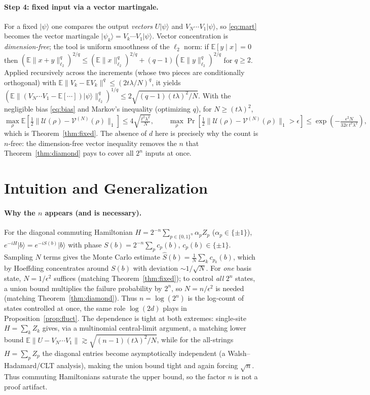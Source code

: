﻿\documentclass[12pt]{article}
\theoremstyle{plain}
\theoremstyle{definition}
\newcommand{\norm}[1]{\lVert #1 \rVert}
\newcommand{\tnorm}[1]{\lVert #1 \rVert_{1}}
\newcommand{\ltwo}[1]{\lVert #1 \rVert_{\ell_2}}
\newcommand{\E}{\mathbb{E}}
\newcommand{\ket}[1]{\lvert #1 \rangle}
\newcommand{\Uchan}{\mathcal{U}}
\newcommand{\Vchan}{\mathcal{V}}
\newcommand{\half}{\tfrac{1}{2}}
\begin{document}
	\paragraph{Step 4: fixed input via a vector martingale.}
	For a fixed $\ket\psi$ one compares the output \emph{vectors} $U\ket\psi$ and
	$V_N\cdots V_1\ket\psi$, so \eqref{eq:mart} becomes the vector martingale
	$\ket{\psi_k}=V_k\cdots V_1\ket\psi$. Vector concentration is \emph{dimension-free}; the tool
	is uniform smoothness of the $\ell_2$ norm: if $\E[y\mid x]=0$ then
	$(\E\ltwo{x+y}^q)^{2/q}\le(\E\ltwo{x}^q)^{2/q}+(q-1)(\E\ltwo{y}^q)^{2/q}$ for $q\ge2$. Applied
	recursively across the increments (whose two pieces are conditionally orthogonal) with
	$\E\norm{V_k-\E V_k}^q\le(2t\lambda/N)^q$, it yields
	$(\E\ltwo{(V_N\cdots V_1-\E[\cdots])\ket\psi}^q)^{1/q}\le2\sqrt{(q-1)(t\lambda)^2/N}$. With the
	negligible bias \eqref{eq:bias} and Markov's inequality (optimizing $q$), for $N\ge(t\lambda)^2$,
	\begin{equation}
		\max_\rho\E[\half\tnorm{\Uchan(\rho)-\Vchan^{(N)}(\rho)}]\le4\sqrt{\tfrac{t^2\lambda^2}{N}},\qquad
		\max_\rho\operatorname{Pr}[\half\tnorm{\Uchan(\rho)-\Vchan^{(N)}(\rho)}>\epsilon]\le\exp(-\tfrac{\epsilon^2N}{32e\,t^2\lambda^2}),
		\label{eq:fixed}
	\end{equation}
	which is Theorem~\ref{thm:fixed}. The absence of $d$ here is precisely why the count is
	$n$-free: the dimension-free vector inequality removes the $n$ that
	Theorem~\ref{thm:diamond} pays to cover all $2^n$ inputs at once.
	
	
	\section{Intuition and Generalization}
	
	\paragraph{Why the $n$ appears (and is necessary).}
	For the diagonal commuting Hamiltonian $H=2^{-n}\sum_{p\in\{0,1\}^n}\alpha_p Z_p$
	($\alpha_p\in\{\pm1\}$), $e^{-iH}\ket b=e^{-iS(b)}\ket b$ with phase
	$S(b)=2^{-n}\sum_p c_p(b)$, $c_p(b)\in\{\pm1\}$. Sampling $N$ terms gives the Monte Carlo
	estimate $\widehat S(b)=\tfrac1N\sum_k c_{p_k}(b)$, which by Hoeffding concentrates around
	$S(b)$ with deviation $\sim1/\sqrt N$. For \emph{one} basis state, $N=1/\epsilon^2$ suffices
	(matching Theorem~\ref{thm:fixed}); to control \emph{all} $2^n$ states, a union bound
	multiplies the failure probability by $2^n$, so $N=n/\epsilon^2$ is needed (matching
	Theorem~\ref{thm:diamond}). Thus $n=\log(2^n)$ is the log-count of states controlled at once,
	the same role $\log(2d)$ plays in Proposition~\ref{prop:fluct}. The dependence is tight at
	both extremes: single-site $H=\sum_k Z_k$ gives, via a multinomial central-limit argument, a
	matching lower bound $\E\norm{U-V_N\cdots V_1}\gtrsim\sqrt{(n-1)(t\lambda)^2/N}$, while for the
	all-strings $H=\sum_{p}Z_p$ the diagonal entries become asymptotically independent (a
	Walsh--Hadamard/CLT analysis), making the union bound tight and again forcing $\sqrt n$. Thus
	commuting Hamiltonians saturate the upper bound, so the factor $n$ is not a proof artifact.
	
\end{document}
